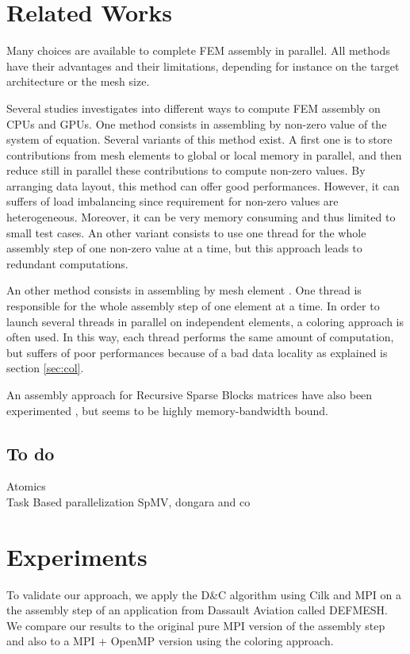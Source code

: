 \documentclass{IOS-Book-Article}
\begin{document}
\section{Related Works}
Many choices are available to complete FEM assembly in parallel.
All methods have their advantages and their limitations, depending for instance on the target architecture or the mesh size.

Several studies \cite{Stanford,CPUGPUasm} investigates into different ways to compute FEM assembly on CPUs and GPUs.
One method consists in assembling by non-zero value of the system of equation. Several variants of this method exist.
A first one is to store contributions from mesh elements to global or local memory in parallel, and then reduce still in parallel these contributions to compute non-zero values.
By arranging data layout, this method can offer good performances. However, it can suffers of load imbalancing since requirement for non-zero values are heterogeneous.
Moreover, it can be very memory consuming and thus limited to small test cases.
An other variant consists to use one thread for the whole assembly step of one non-zero value at a time, but this approach leads to redundant computations.

An other method consists in assembling by mesh element \cite{CUDAfe,CPUfe1,CPUfe2}. One thread is responsible for the whole assembly step of one element at a time.
In order to launch several threads in parallel on independent elements, a coloring approach is often used.
In this way, each thread performs the same amount of computation, but suffers of poor performances because of a bad data locality as explained is section \ref{sec:col}.

An assembly approach for Recursive Sparse Blocks matrices have also been experimented \cite{RSBasm}, but seems to be highly memory-bandwidth bound.

\subsection{To do}
Atomics\\
Task Based parallelization SpMV, dongara and co \cite{MPI_task}\\

\section{Experiments}
To validate our approach, we apply the D\&C algorithm using Cilk and MPI on a the assembly step of an application from Dassault Aviation called DEFMESH.
We compare our results to the original pure MPI version of the assembly step and also to a MPI + OpenMP version using the coloring approach.
\end{document}
